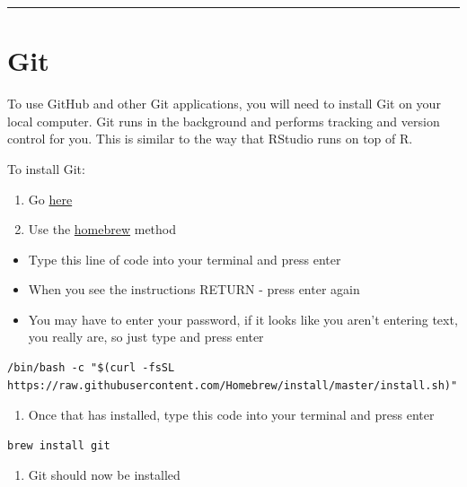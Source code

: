 \documentclass[]{book}
\providecommand{\tightlist}{%
  \setlength{\itemsep}{0pt}\setlength{\parskip}{0pt}}
\begin{document}
\begin{center}\rule{0.5\linewidth}{0.5pt}\end{center}

\section{Git}\label{git}

To use GitHub and other Git applications, you will need to install Git
on your local computer. Git runs in the background and performs tracking
and version control for you. This is similar to the way that RStudio
runs on top of R.

To install Git:

\begin{enumerate}
\def\labelenumi{\arabic{enumi}.}
\tightlist
\item
  Go \href{https://git-scm.com/downloads}{here}
\item
  Use the \href{https://brew.sh/}{homebrew} method
\end{enumerate}

\begin{itemize}
\tightlist
\item
  Type this line of code into your terminal and press enter
\item
  When you see the instructions RETURN - press enter again
\item
  You may have to enter your password, if it looks like you aren't
  entering text, you really are, so just type and press enter
\end{itemize}

\begin{verbatim}
/bin/bash -c "$(curl -fsSL https://raw.githubusercontent.com/Homebrew/install/master/install.sh)"
\end{verbatim}

\begin{enumerate}
\def\labelenumi{\arabic{enumi}.}
\setcounter{enumi}{2}
\tightlist
\item
  Once that has installed, type this code into your terminal and press
  enter
\end{enumerate}

\begin{verbatim}
brew install git
\end{verbatim}

\begin{enumerate}
\def\labelenumi{\arabic{enumi}.}
\setcounter{enumi}{3}
\tightlist
\item
  Git should now be installed
\end{enumerate}
\end{document}
